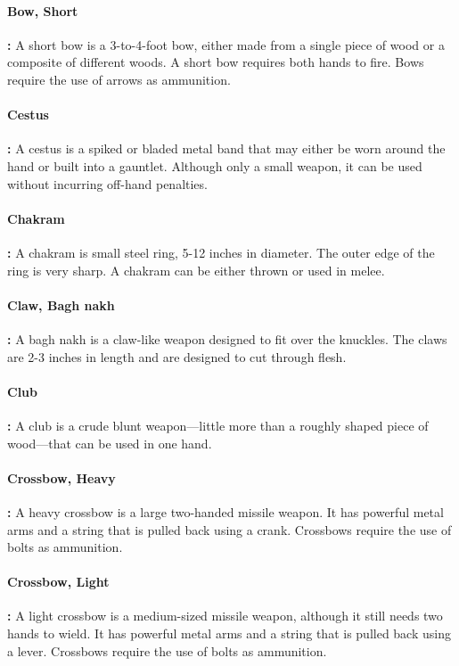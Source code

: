 \begin{multicols*}{2}
\paragraph{Bow, Short}\textbf{:} A short bow is a 3-to-4-foot bow, either made from a single piece of wood or a composite of different woods. A short bow requires both hands to fire. Bows require the use of arrows as ammunition.

\paragraph{Cestus}\textbf{:} A cestus is a spiked or bladed metal band that may either be worn around the hand or built into a gauntlet. Although only a small weapon, it can be used without incurring off-hand penalties.

\paragraph{Chakram}\textbf{:} A chakram is small steel ring, 5-12 inches in diameter. The outer edge of the ring is very sharp. A chakram can be either thrown or used in melee.

\paragraph{Claw, Bagh nakh}\textbf{:} A bagh nakh is a claw-like weapon designed to fit over the knuckles. The claws are 2-3 inches in length and are designed to cut through flesh.

\paragraph{Club}\textbf{:} A club is a crude blunt weapon—little more than a roughly shaped piece of wood—that can be used in one hand.

\paragraph{Crossbow, Heavy}\textbf{:} A heavy crossbow is a large two-handed missile weapon. It has powerful metal arms and a string that is pulled back using a crank. Crossbows require the use of bolts as ammunition.

\paragraph{Crossbow, Light}\textbf{:} A light crossbow is a medium-sized missile weapon, although it still needs two hands to wield. It has powerful metal arms and a string that is pulled back using a lever. Crossbows require the use of bolts as ammunition.


\end{multicols*}
